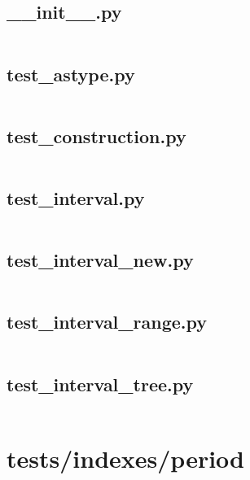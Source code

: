 \documentclass{article}
\begin{document}
\subsection{\_\_init\_\_.py}
\inputminted{python}{/home/dufferzafar/dev/@clones/pandas/pandas/tests/indexes/interval/__init__.py}
\newpage

\subsection{test\_astype.py}
\inputminted{python}{/home/dufferzafar/dev/@clones/pandas/pandas/tests/indexes/interval/test_astype.py}
\newpage

\subsection{test\_construction.py}
\inputminted{python}{/home/dufferzafar/dev/@clones/pandas/pandas/tests/indexes/interval/test_construction.py}
\newpage

\subsection{test\_interval.py}
\inputminted{python}{/home/dufferzafar/dev/@clones/pandas/pandas/tests/indexes/interval/test_interval.py}
\newpage

\subsection{test\_interval\_new.py}
\inputminted{python}{/home/dufferzafar/dev/@clones/pandas/pandas/tests/indexes/interval/test_interval_new.py}
\newpage

\subsection{test\_interval\_range.py}
\inputminted{python}{/home/dufferzafar/dev/@clones/pandas/pandas/tests/indexes/interval/test_interval_range.py}
\newpage

\subsection{test\_interval\_tree.py}
\inputminted{python}{/home/dufferzafar/dev/@clones/pandas/pandas/tests/indexes/interval/test_interval_tree.py}
\newpage

\section{tests/indexes/period}
\end{document}
